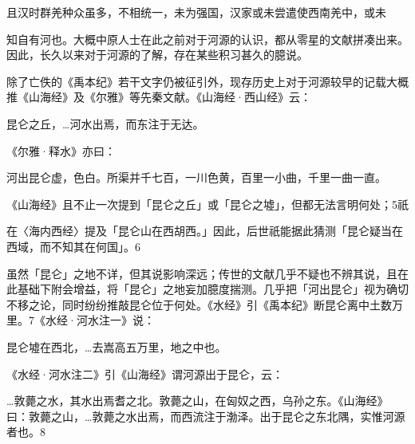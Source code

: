 \begin{BookQuote}
且汉时群羌种众虽多，不相统一，未为强国，汉家或未尝遣使西南羌中，或未
\end{BookQuote}

知自有河也。大概中原人士在此之前对于河源的认识，都从零星的文献拼凑出来。因此，长久以来对于河源的了解，存在某些积习甚久的臆说。

除了亡佚的《禹本纪》若干文字仍被征引外，现存历史上对于河源较早的记载大概推《山海经》及《尔雅》等先秦文献。《山海经·西山经》云：

\begin{BookQuote}
昆仑之丘，…河水出焉，而东注于无达。
\end{BookQuote}

《尔雅·释水》亦曰：

\begin{BookQuote}
河出昆仑虚，色白。所渠并千七百，一川色黄，百里一小曲，千里一曲一直。
\end{BookQuote}

《山海经》且不止一次提到「昆仑之丘」或「昆仑之墟」，但都无法言明何处；5祇

\vfill
\begin{BookNotes}
\end{BookNotes}

\noindent 在〈海内西经〉提及「昆仑山在西胡西。」因此，后世祇能据此猜测「昆仑疑当在西域，而不知其在何国」。6

虽然「昆仑」之地不详，但其说影响深远；传世的文献几乎不疑也不辨其说，且在此基础下附会增益，将「昆仑」之地妄加臆度揣测。几乎把「河出昆仑」视为确切不移之论，同时纷纷推敲昆仑位于何处。《水经》引《禹本纪》断昆仑离中土数万里。7《水经·河水注一》说：

\begin{BookQuote}
昆仑墟在西北，…去嵩高五万里，地之中也。
\end{BookQuote}

《水经·河水注二》引《山海经》谓河源出于昆仑，云：

\begin{BookQuote}
…敦薨之水，其水出焉耆之北。敦薨之山，在匈奴之西，乌孙之东。《山海经》曰：敦薨之山，…敦薨之水出焉，而西流注于渤泽。出于昆仑之东北隅，实惟河源者也。8
\end{BookQuote}

